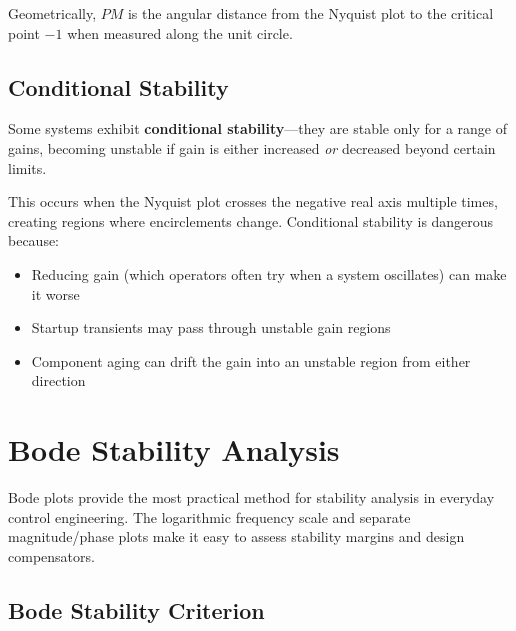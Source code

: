 Geometrically, $PM$ is the angular distance from the Nyquist plot to the critical point $-1$ when measured along the unit circle.

\subsection{Conditional Stability}

Some systems exhibit \textbf{conditional stability}---they are stable only for a range of gains, becoming unstable if gain is either increased \textit{or} decreased beyond certain limits.

This occurs when the Nyquist plot crosses the negative real axis multiple times, creating regions where encirclements change. Conditional stability is dangerous because:

\begin{itemize}
    \item Reducing gain (which operators often try when a system oscillates) can make it worse
    \item Startup transients may pass through unstable gain regions
    \item Component aging can drift the gain into an unstable region from either direction
\end{itemize}


\section{Bode Stability Analysis}
\label{sec:bode_stability}

Bode plots provide the most practical method for stability analysis in everyday control engineering. The logarithmic frequency scale and separate magnitude/phase plots make it easy to assess stability margins and design compensators.

\subsection{Bode Stability Criterion}

